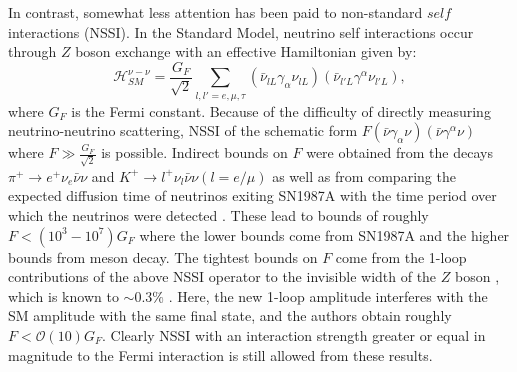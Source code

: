 \documentclass[a4paper,12pt]{article}
\begin{document}
In contrast, somewhat less attention has been paid to non-standard $\textit{self}$ interactions (NSSI). In the Standard Model, neutrino self interactions occur through $Z$ boson exchange with an effective Hamiltonian given by:
\begin{equation} \label{eq:2}
\mathcal{H}_{SM}^{\nu-\nu} = \frac{G_{F}}{\sqrt{2}}\sum_{l,l' = e,\mu,\tau} (\bar{\nu}_{lL}\gamma_{\alpha}\nu_{lL})(\bar{\nu}_{l'L}\gamma^{\alpha}\nu_{l'L}),
\end{equation} 
where $G_{F}$ is the Fermi constant. Because of the difficulty of directly measuring neutrino-neutrino scattering, NSSI of the schematic form $F(\bar{\nu}\gamma_{\alpha}\nu)(\bar{\nu}\gamma^{\alpha}\nu)$ where $F \gg \frac{G_{F}}{\sqrt{2}}$ is possible. Indirect bounds on $F$ were obtained from the decays $\pi^{+}\rightarrow e^{+}\nu_{e}\bar{\nu}\nu$ and $K^{+}\rightarrow l^{+}\nu_{l}\bar{\nu}\nu(l = e/\mu)$ \cite{Manohar:1987ec,Bilenky:1980ym} as well as from comparing the expected diffusion time of neutrinos exiting SN1987A with the time period over which the neutrinos were detected \cite{BialynickaBirula:1964zz}. These lead to bounds of roughly $F< (10^{3}-10^{7}) G_{F}$ where the lower bounds come from SN1987A and the higher bounds from meson decay. The tightest bounds on $F$ come from the 1-loop contributions of the above NSSI operator to the invisible width of the $Z$ boson \cite{Bilenky:1994ma}, which is known to $\sim 0.3\%$ \cite{Tanabashi:2018oca}. Here, the new 1-loop amplitude interferes with the SM amplitude with the same final state, and the authors obtain roughly $F<\mathcal{O}(10)G_{F}$. Clearly NSSI with an interaction strength greater or equal in magnitude to the Fermi interaction is still allowed from these results.
\vskip 0.15in
\end{document}
